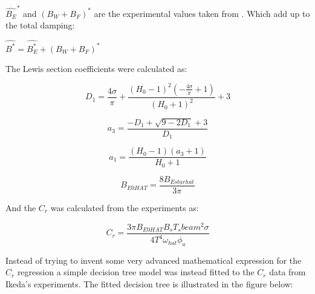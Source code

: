     

    \(\hat{B_E}^*\) and \((B_W+B_F)^*\) are the experimental values taken
from \cite{7505983/4AFVVGNT}. Which add up to the total damping:

    \(\hat{B^*} = \hat{B^*_E} + (B_W+B_F)^*\)

    The Lewis section coefficients were calculated as:
 
            
    
    \begin{equation}
D_{1} = \frac{4 \sigma}{\pi} + \frac{\left(H_{0} - 1\right)^{2} \left(- \frac{4 \sigma}{\pi} + 1\right)}{\left(H_{0} + 1\right)^{2}} + 3
\label{eq:equation}
\end{equation}

    
 
            
    
    \begin{equation}
a_{3} = \frac{- D_{1} + \sqrt{9 - 2 D_{1}} + 3}{D_{1}}
\label{eq:equation}
\end{equation}

    
 
            
    
    \begin{equation}
a_{1} = \frac{\left(H_{0} - 1\right) \left(a_{3} + 1\right)}{H_{0} + 1}
\label{eq:equation}
\end{equation}

    
 
            
    
    \begin{equation}
B_{E0 HAT} = \frac{8 B_{E star hat}}{3 \pi}
\label{eq:equation}
\end{equation}

    

    And the \(C_r\) was calculated from the experiments as:
 
            
    
    \begin{equation}
C_{r} = \frac{3 \pi B_{E0 HAT} B_{s} T_{s} beam^{2} \sigma}{4 T^{4} \omega_{hat} \phi_{a}}
\label{eq:equation}
\end{equation}

    

    Instead of trying to invent some very advanced mathematical expression
for the \(C_r\) regression a simple decision tree model was instead
fitted to the \(C_r\) data from Ikeda's experiments. The fitted decision
tree is illustrated in the figure below:

